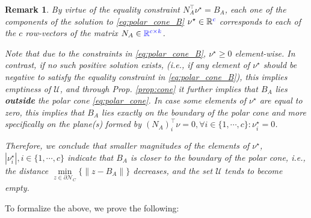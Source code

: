 \documentclass[letterpaper, 10 pt, conference]{ieeeconf}  %
\newtheorem{remark}{\textbf{Remark}}
\begin{document}
{\color{red}
\begin{remark}\label{rem:B_cone_components}
    By virtue of the equality constraint $N_A^\top \nu^\star = B_A$, each one of the components of the solution to \eqref{eq:polar_cone_B} $\nu^\star \in \mathbb{R}{\color{blue}^c}$ corresponds to each of the $c$ row-vectors of the matrix $N_A\in{\color{blue}\mathbb{R}^{c\times k}}$.
    \par 
    Note that due to the constraints in \eqref{eq:polar_cone_B}, $\nu^\star \geq 0$ element-wise. In contrast, if no such positive solution exists, (i.e., if any element of $\nu^\star$ should be negative to satisfy the equality constraint in \eqref{eq:polar_cone_B}), this implies emptiness of $\mathcal{U}$, and through Prop. \ref{prop:cone} it further implies that $B_A$ lies \textbf{outside} the polar cone \eqref{eq:polar_cone}. In case some elements of $\nu^\star $ are equal to zero, this implies that $B_A$ lies exactly on the boundary of the polar cone and more specifically on the plane(s) formed by $(N_A)_i^\top \nu = 0, \forall i\in \{1,\cdots,c\}: \nu^\star_i = 0$.
    \par 
    Therefore, we conclude that smaller magnitudes of the elements of $\nu^\star$, $|\nu^\star_i|, i\in \{1,\cdots,c\}$ indicate that $B_A$ is closer to the boundary of the polar cone, i.e., the distance $\underset{z \in \partial \mathcal{N}_C}{\min}\{\| z - B_A \| \}$ decreases, and the set $\mathcal{U}$ tends to become empty. 
\end{remark}
}
To formalize the above, we prove the following: 
\end{document}
